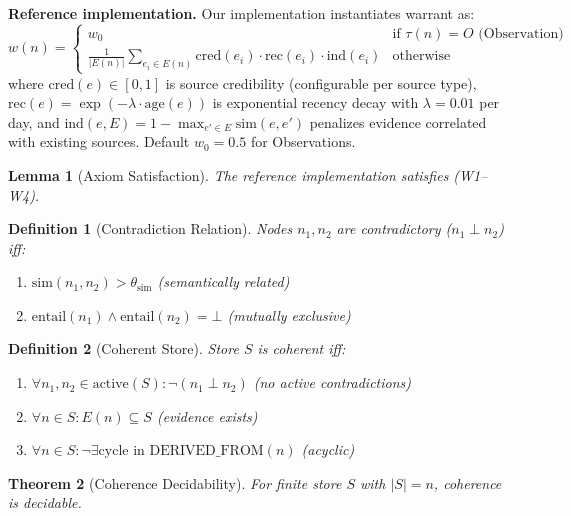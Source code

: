 \documentclass[11pt,letterpaper]{article}
\newtheorem{definition}{Definition}[section]
\newtheorem{theorem}{Theorem}[section]
\newtheorem{lemma}[theorem]{Lemma}
\begin{document}
\textbf{Reference implementation.} Our implementation instantiates warrant as:
\[
w(n) = \begin{cases}
w_0 & \text{if } \tau(n) = O \text{ (Observation)} \\[4pt]
\displaystyle\frac{1}{|E(n)|} \sum_{e_i \in E(n)} \text{cred}(e_i) \cdot \text{rec}(e_i) \cdot \text{ind}(e_i) & \text{otherwise}
\end{cases}
\]
where $\text{cred}(e) \in [0,1]$ is source credibility (configurable per source type), $\text{rec}(e) = \exp(-\lambda \cdot \text{age}(e))$ is exponential recency decay with $\lambda = 0.01$ per day, and $\text{ind}(e, E) = 1 - \max_{e' \in E} \text{sim}(e, e')$ penalizes evidence correlated with existing sources. Default $w_0 = 0.5$ for Observations.

\begin{lemma}[Axiom Satisfaction]
\label{lem:monotone}
The reference implementation satisfies (W1--W4).
\end{lemma}

\begin{definition}[Contradiction Relation]
\label{def:contradiction}
Nodes $n_1, n_2$ are contradictory ($n_1 \perp n_2$) iff:
\begin{enumerate}[noitemsep]
    \item $\text{sim}(n_1, n_2) > \theta_{\text{sim}}$ (semantically related)
    \item $\text{entail}(n_1) \wedge \text{entail}(n_2) = \bot$ (mutually exclusive)
\end{enumerate}
\end{definition}

\begin{definition}[Coherent Store]
\label{def:coherent}
Store $S$ is coherent iff:
\begin{enumerate}[noitemsep]
    \item $\forall n_1, n_2 \in \text{active}(S): \neg(n_1 \perp n_2)$ (no active contradictions)
    \item $\forall n \in S: E(n) \subseteq S$ (evidence exists)
    \item $\forall n \in S: \neg\exists \text{cycle in DERIVED\_FROM}(n)$ (acyclic)
\end{enumerate}
\end{definition}

\begin{theorem}[Coherence Decidability]
\label{thm:coherence}
For finite store $S$ with $|S| = n$, coherence is decidable.
\end{theorem}
\end{document}
